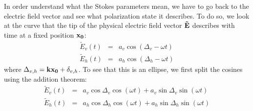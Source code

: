 In order understand what the Stokes parameters mean, we have to go
back to the electric field vector and see what polarization state it
describes.  To do so, we look at the curve that the tip of the
physical electric field vector $\mathbf{\tilde{E}}$ describes with
time at a fixed position $\mathbf{x_0}$:
\begin{eqnarray}
  \tilde{E}_v (t) &=& a_v \cos(\Delta_v - \omega t)\\
  \tilde{E}_h (t) &=& a_h \cos(\Delta_h - \omega t)
\end{eqnarray}
where $\Delta_{v,h} = \mathbf{k}\mathbf{x_0} + \delta_{v,h}$. 
To see that this is an ellipse, we first split the cosines using
the addition theorem:
\begin{eqnarray}
  \label{eq:polarization:tip_of_fieldvec1}
  \tilde{E}_v (t) &=&   a_v \cos\Delta_v \cos(\omega t)
                      + a_v \sin\Delta_v \sin(\omega t)\\
  \label{eq:polarization:tip_of_fieldvec2}
  \tilde{E}_h (t) &=&   a_h \cos\Delta_h \cos(\omega t)
                      + a_h \sin\Delta_h \sin(\omega t)
\end{eqnarray}


